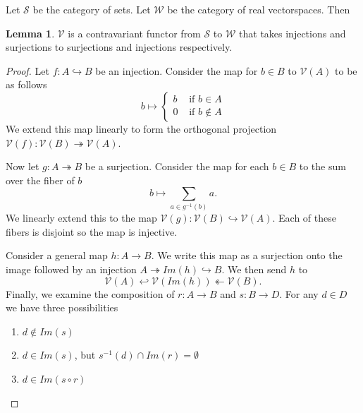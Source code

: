 \documentclass[12pt,a4paper]{article}
\theoremstyle{myrule}
\theoremstyle{postulate}
\theoremstyle{definition}
\newtheorem{lemma}[theorem]{Lemma}
\begin{document}
Let $\mathcal{S}$ be the category of sets.  Let $\mathcal{W}$ be the category of real vectorspaces.  Then
\begin{lemma}
$\mathcal{V}$ is a contravariant functor from $\mathcal{S}$ to $\mathcal{W}$ that takes injections and surjections to surjections and injections respectively.
\end{lemma}
\begin{proof}
  Let $f:A \hookrightarrow B$ be an injection. Consider the map for $b \in B$ to $\mathcal{V}(A)$ to be as follows
  \[
     b \mapsto \left\{ \begin{array}{cc} b & \text{ if } b \in A \\ 0 & \text{ if } b \not \in A  \end{array} \right.
\]
We extend this map linearly to form the orthogonal projection $\mathcal{V}(f):\mathcal{V}(B) \twoheadrightarrow \mathcal{V}(A)$.

Now let $g:A \twoheadrightarrow B$ be a surjection.  Consider the map for each $b \in B$ to the sum over the fiber of $b$
  \[
  b \mapsto \sum_{a \in g^{-1}(b)} a.
  \]
We linearly extend this to the map $\mathcal{V}(g):\mathcal{V}(B) \hookrightarrow  \mathcal{V}(A)$.  Each of these fibers is disjoint so the map is injective.

  Consider a general map $h:A \rightarrow B$.  We write this map as a surjection onto the image followed by an injection  $A \twoheadrightarrow Im(h) \hookrightarrow B$.  We then send $h$ to
 \[
 \mathcal{V}(A) \hookleftarrow \mathcal{V}(Im(h)) \twoheadleftarrow \mathcal{V}(B).
 \]
  Finally, we examine the composition of $r:A \rightarrow B$ and $s:B\rightarrow D$.  For any $d \in D$ we have three possibilities
  \begin{enumerate}
  \item $d \not \in Im(s)$
  \item $d \in Im(s)$, but $s^{-1}(d) \cap Im(r) = \emptyset$
  \item $d \in Im(s \circ r)$
  \end{enumerate}


\end{proof}
\end{document}
